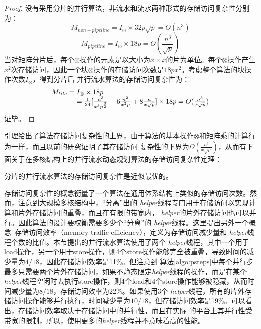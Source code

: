\begin{flushleft}
\begin{proof}
	没有采用分片的并行算法，非流水和流水两种形式的存储访问复杂性分别为：
	\begin{displaymath}
	M_{non-pipeline} = I_{\otimes}\times 32p\sqrt{p} = O(n^{3})
	\end{displaymath}
	\begin{displaymath}
	M_{pipeline} = I_{\otimes}\times 18p = O(\frac{n^{3}}{\sqrt{p}})
	\end{displaymath}
	当对矩阵分片后，每个$\otimes$操作的元素是以大小为$x\times
	x$的片为单位。每个$\otimes$操作产生$x^{2}$次存储访问，因此一个块$\otimes$操作的存储访问次数是$18px^{2}$。考虑整个算法的块操作次数$I_{\otimes}$，得到分片后
	并行流水算法的存储访问复杂性为：
	\begin{displaymath}
	\begin{array}{ll}
	M_{tile} = I_{\otimes}\times 18p \\
	\hspace*{3pc}= \frac{1}{24}[\frac{n^{3}}{x^{3}p^{\frac{3}{2}}}-6\frac{n^{2}}{x^{2}p}+8\frac{n}{x\sqrt{p}}]\times 18p=O(\frac{n^{3}}{x\sqrt{p}})
	\end{array}
	\end{displaymath}
	证毕。
\end{proof}
引理\label{lemma:memory_complexity}给出了算法存储访问复杂性的上界，由于算法的基本操作$\otimes$和矩阵乘的计算行为一样，而且以前的研究证明了其存储访问
复杂性的下界为$\Omega(\frac{n^{3}}{x\sqrt{p}})$\cite{layout-tpds03}，从而有下面关于在多核结构上的并行流水动态规划算法的存储访问复杂性定理：
\begin{theorem}
	分片的并行流水算法的存储访问复杂性是近似最优的。
\end{theorem}
存储访问复杂性的概念衡量了一个算法在通用体系结构上类似的存储访问次数。然而，注意到大规模多核结构中，“分离”出的{\em
	helper}线程专门用于存储访问以实现计算和片外存储访问的重叠，而且在有限的带宽内，{\em
	helper}的片外存储访问也可以并行。因此算法的设计要权衡需要多少个“分离”的{\em
	helper}线程。这里提出另外一个概念--存储访问效率（memory-traffic efficiency），定义为存储访问减少量和{\em
	helper}线程个数的比值。本节提出的并行流水算法使用了两个{\em
	helper}线程，其中一个用于load操作，另一个用于store操作，则4个store操作能够完全被重叠，导致时间的减少量为$4/18$，因此存储访问效率是11\%。但注意到
算法\ref{algo:psteps}中每个并行步最多只需要两个片外存储访问，如果不静态限定{\em helper}线程的操作，而是在某个{\em
	helper}线程空闲时去执行store操作，则4个load和4个store操作能够被隐藏，从而时间减少量为$8/18$，存储访问效率为22\%。如果使用3个{\em
	helper}线程，所有的片外存储访问操作能够并行执行，时间减少量为$10/18$，但存储访问效率是19\%。可以看出，存储访问效率取决于存储访问中的并行性，而且在实际
的平台上其并行性受带宽的限制，所以，使用更多的{\em helper}线程并不意味着高的性能。

\end{flushleft}
